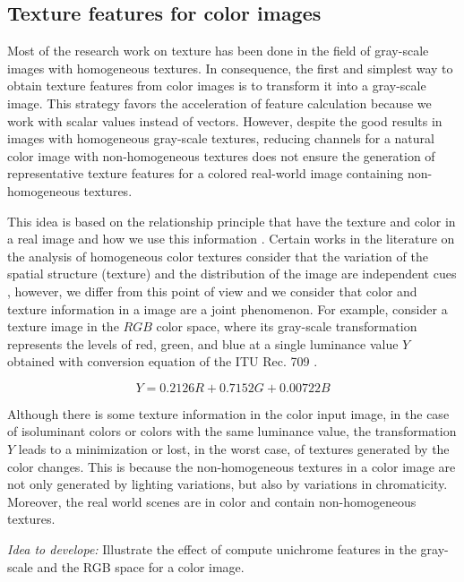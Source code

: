 \subsection{Texture features for color images}

Most of the research work on texture has been done in the field of gray-scale images with homogeneous textures. In consequence, the first and simplest way to obtain texture features from color images is to transform it into a gray-scale image. This strategy favors the acceleration of feature calculation because we work with scalar values instead of vectors. However, despite the good results in images with homogeneous gray-scale textures, reducing channels for a natural color image with non-homogeneous textures does not ensure the generation of representative texture features for a colored real-world image containing non-homogeneous textures.

This idea is based on the relationship principle that have the texture and color in a real image and how we use this information \cite{Maenpaa.Pietikainen:PR:2004}. Certain works in the literature on the analysis of homogeneous color textures consider that the variation of the spatial structure (texture) and the distribution of the image are independent cues \cite{Permuter.Francos.ea:PR:2006}, however, we differ from this point of view and we consider that  color and texture information in a image are a joint phenomenon. For example, consider a texture image in the $RGB$ color space, where its gray-scale transformation represents the levels of red, green, and blue at a single luminance value $Y$ obtained with conversion equation of the ITU Rec. 709 \cite{Artusi.Banterle.ea:Book:2016}.

\begin{equation}\label{eq:color2gray_formula}
    Y = 0.2126 R + 0.7152 G + 0.00722 B
\end{equation}
 
Although there is some texture information in the color input image, in the case of isoluminant colors or colors with the same luminance value, the transformation $Y$ leads to a minimization or lost, in the worst case, of textures generated by the color changes. This is because the non-homogeneous textures in a color image are not only generated by lighting variations, but also by variations in chromaticity. Moreover, the real world scenes are in color and contain non-homogeneous textures.

\textit{Idea to develope:} Illustrate the effect of compute unichrome features in the gray-scale and the RGB space for a color image.

